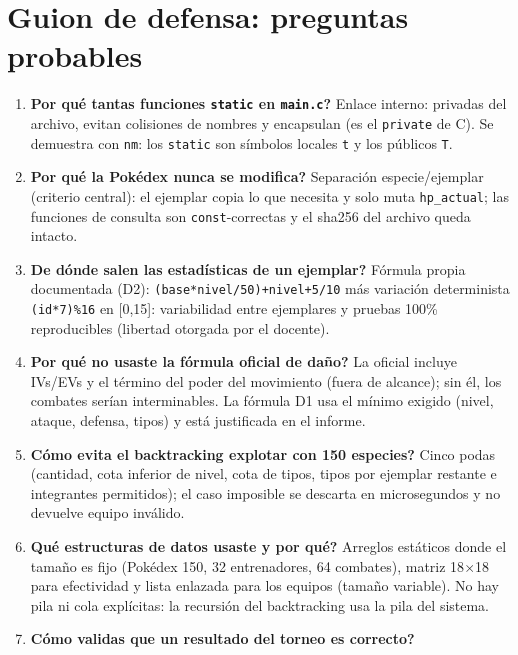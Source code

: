 \documentclass[11pt,a4paper]{article}
\begin{document}
\section{Guion de defensa: preguntas probables}
\begin{enumerate}[leftmargin=1.6em]
\item \textbf{\textquestiondown Por qu\'e tantas funciones \texttt{static} en \texttt{main.c}?}
  Enlace interno: privadas del archivo, evitan colisiones de nombres y
  encapsulan (es el \texttt{private} de C). Se demuestra con \texttt{nm}: los
  \texttt{static} son s\'imbolos locales \texttt{t} y los p\'ublicos \texttt{T}.
\item \textbf{\textquestiondown Por qu\'e la Pok\'edex nunca se modifica?}
  Separaci\'on especie/ejemplar (criterio central): el ejemplar copia lo que
  necesita y solo muta \texttt{hp\_actual}; las funciones de consulta son
  \texttt{const}-correctas y el sha256 del archivo queda intacto.
\item \textbf{\textquestiondown De d\'onde salen las estad\'isticas de un ejemplar?}
  F\'ormula propia documentada (D2): \texttt{(base*nivel/50)+nivel+5/10}
  m\'as variaci\'on determinista \texttt{(id*7)\%16} en [0,15]: variabilidad
  entre ejemplares y pruebas 100\% reproducibles (libertad otorgada por el
  docente).
\item \textbf{\textquestiondown Por qu\'e no usaste la f\'ormula oficial de da\~no?}
  La oficial incluye IVs/EVs y el t\'ermino del poder del movimiento (fuera de
  alcance); sin \'el, los combates ser\'ian interminables. La f\'ormula D1 usa
  el m\'inimo exigido (nivel, ataque, defensa, tipos) y est\'a justificada en
  el informe.
\item \textbf{\textquestiondown C\'omo evita el backtracking explotar con 150 especies?}
  Cinco podas (cantidad, cota inferior de nivel, cota de tipos, tipos por
  ejemplar restante e integrantes permitidos); el caso imposible se descarta en
  microsegundos y no devuelve equipo inv\'alido.
\item \textbf{\textquestiondown Qu\'e estructuras de datos usaste y por qu\'e?}
  Arreglos est\'aticos donde el tama\~no es fijo (Pok\'edex 150, 32
  entrenadores, 64 combates), matriz 18$\times$18 para efectividad y lista
  enlazada para los equipos (tama\~no variable). No hay pila ni cola
  expl\'icitas: la recursi\'on del backtracking usa la pila del sistema.
\item \textbf{\textquestiondown C\'omo validas que un resultado del torneo es correcto?}

\end{enumerate}
\end{document}
